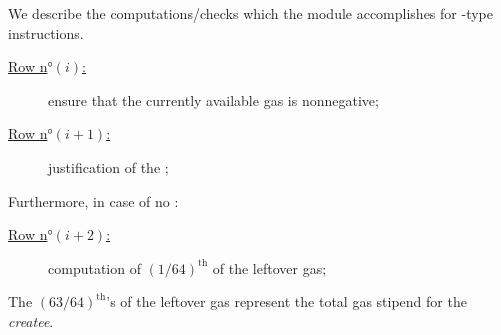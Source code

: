 We describe the computations/checks which the \stpMod{} module accomplishes for -type instructions.
\begin{description}
        \item[\colorbox{solarized-orange}{\underline{Row n$°(i)$:}}] ensure that the currently available gas is nonnegative;
        \item[\colorbox{solarized-orange}{\underline{Row n$°(i + 1)$:}}] justification of the \oogX{};
\end{description}
Furthermore, in case of no \oogxSH{}:
\begin{description}
        \item[\colorbox{solarized-green} {\underline{Row n$°(i + 2)$:}}] computation of $(1/64)^\text{th}$ of the leftover gas;
\end{description}
\saNote{} The $(63/64)^\text{th}$'s of the leftover gas represent the total gas stipend for the \emph{createe}.
